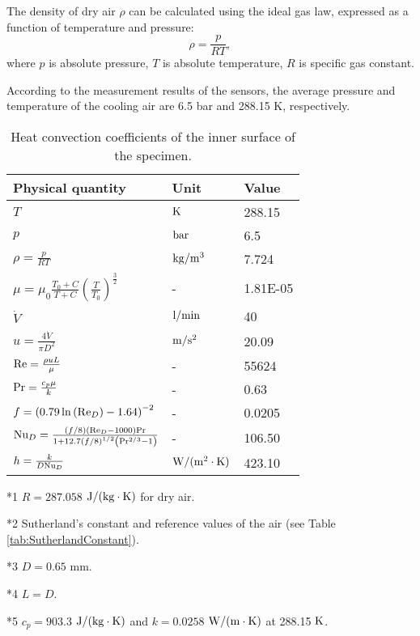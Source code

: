 The density of dry air $\rho$ can be calculated using the ideal gas law, expressed as a function of temperature and pressure:
\begin{equation}
\rho  = \frac{p}{{RT}},
\label{Equ:AirDensity}
\end{equation}
where
$p$ is absolute pressure,
$T$ is absolute temperature,
$R$ is specific gas constant.

According to the measurement results of the sensors, the average pressure and temperature of the cooling air are 6.5 bar and 288.15 K, respectively.

\renewcommand\arraystretch{1.2}
\begin{table}[htbp]
\centering
  \begin{threeparttable}
  \centering
  \caption{Heat convection coefficients of the inner surface of the specimen.}
    \begin{tabular}{p{6cm}p{3cm}p{3cm}}
    \toprule
    Physical quantity   & Unit & Value  \\
    \midrule
    $T$   & ${\rm{K}}$ & 288.15  \\
    $p$   & ${\rm{bar}}$ & 6.5   \\
    $\rho  = \frac{p}{{RT}}$ \tnote{*1} & ${\rm{kg/}}{{\rm{m}}^{\rm{3}}}$ & 7.724 \\
    $\mu  = {\mu _0}\frac{{{T_0} + C}}{{T + C}}{\left( {\frac{T}{{{T_0}}}} \right)^{\frac{3}{2}}}$ \tnote{*2} & -     & 1.81E-05 \\
    ${\dot V}$ & ${\rm{l/min}}$ & 40  \\
    $u = \frac{{4\dot V}}{{\pi {D^2}}}$ \tnote{*3} & ${\rm{m/}}{{\rm{s}}^2}$ & 20.09  \\
    ${\rm{Re}} = \frac{{\rho uL}}{\mu }$ \tnote{*4} & -     & 55624  \\
    ${\rm{Pr}} = \frac{{{c_p}\mu }}{k}$ \tnote{*5} & -     & 0.63  \\
    $f = {\left( {0.79\ln \left( {{\rm{R}}{{\rm{e}}_D}} \right) - 1.64} \right)^{ - 2}}$ & -     & 0.0205  \\
    ${\rm{N}}{{\rm{u}}_D} = \frac{{\left( {f/8} \right)\left( {{\rm{R}}{{\rm{e}}_D} - 1000} \right){\rm{Pr}}}}{{1 + 12.7{{(f/8)}^{1/2}}\left( {{\rm{P}}{{\rm{r}}^{2/3}} - 1} \right)}}$ & -     & 106.50  \\
    $h = \frac{k}{{D{\rm{N}}{{\rm{u}}_D}}}$ & ${\rm{W/(}}{{\rm{m}}^{\rm{2}}} \cdot {\rm{K)}}$ & 423.10  \\
    \bottomrule
    \end{tabular}%
    \begin{tablenotes}
    \item[*1] $R = 287.058$ ${\rm{J/(kg}} \cdot {\rm{K}})$ for dry air.
    \item[*2] Sutherland's constant and reference values of the air (see Table \ref{tab:SutherlandConstant}).
    \item[*3] $D=0.65$ mm.
    \item[*4] $L=D$.
    \item[*5] $c_{p}=903.3$ ${\rm{J/(kg}} \cdot {\rm{K}})$ and $k=0.0258$ ${\rm{W/(m}} \cdot {\rm{K}})$ at 288.15 ${\rm{K}}$.
    \end{tablenotes}
    \end{threeparttable}
  \label{tab:addlabel}%
\end{table}%
